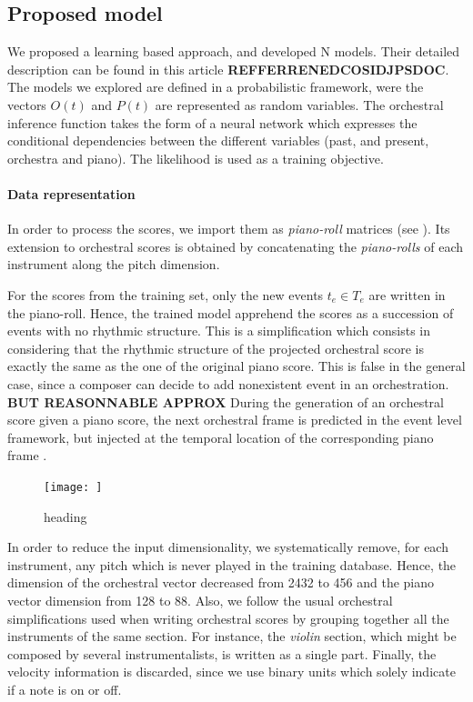 \documentclass[twoside,twocolumn]{article}
\begin{document}
\subsection{Proposed model}
We proposed a learning based approach, and developed N models. Their detailed description can be found in this article \textbf{REFFERRENEDCOSIDJPSDOC}.
The models we explored are defined in a probabilistic framework, were the vectors $O(t)$ and $P(t)$ are represented as random variables. The orchestral inference function takes the form of a neural network which expresses the conditional dependencies between the different variables (past, and present, orchestra and piano). The likelihood is used as a training objective.

\paragraph{Data representation}
In order to process the scores, we import them as \textit{piano-roll} matrices (see ). 
Its extension to orchestral scores is obtained by concatenating the \textit{piano-rolls} of each instrument along the pitch dimension.

For the scores from the training set, only the new events $t_e \in T_e$ are written in the piano-roll.
Hence, the trained model apprehend the scores as a succession of events with no rhythmic structure.
This is a simplification which consists in considering that the rhythmic structure of the projected orchestral score is exactly the same as the one of the original piano score. 
This is false in the general case, since a composer can decide to add nonexistent event in an orchestration.
\textbf{BUT REASONNABLE APPROX}
During the generation of an orchestral score given a piano score, the next orchestral frame is predicted in the event level framework, but injected at the temporal location of the corresponding piano frame .

\begin{figure}
\centering
\texttt{[image: ]}
\caption{heading}
\label{fig:event_level_generation}
\end{figure}

In order to reduce the input dimensionality, we systematically remove, for each instrument, any pitch which is never played in the training database. Hence, the dimension of the orchestral vector decreased from 2432 to 456 and the piano vector dimension from 128 to 88.
Also, we follow the usual orchestral simplifications used when writing orchestral scores by grouping together all the instruments of the same section. For instance, the \textit{violin} section, which might be composed by several instrumentalists, is written as a single part.
Finally, the velocity information is discarded, since we use binary units which solely indicate if a note is on or off.
\end{document}
